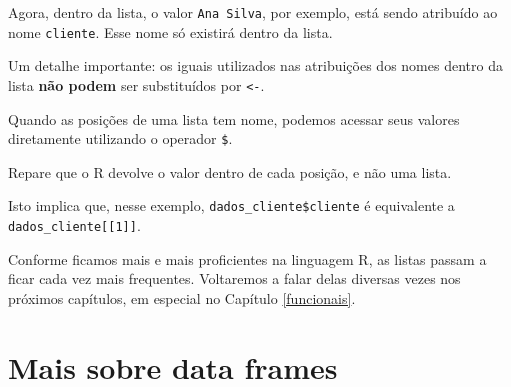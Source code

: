 \documentclass[
]{book}
\newenvironment{Shaded}{\begin{snugshade}}{\end{snugshade}}
\newcommand{\DecValTok}[1]{\textcolor[rgb]{0.00,0.00,0.81}{#1}}
\newcommand{\DocumentationTok}[1]{\textcolor[rgb]{0.56,0.35,0.01}{\textbf{\textit{#1}}}}
\newcommand{\FunctionTok}[1]{\textcolor[rgb]{0.00,0.00,0.00}{#1}}
\newcommand{\NormalTok}[1]{#1}
\newcommand{\SpecialCharTok}[1]{\textcolor[rgb]{0.00,0.00,0.00}{#1}}
\begin{document}
Agora, dentro da lista, o valor \texttt{Ana\ Silva}, por exemplo, está sendo atribuído ao nome \texttt{cliente}. Esse nome só existirá dentro da lista.

Um detalhe importante: os iguais utilizados nas atribuições dos nomes dentro da lista \textbf{não podem} ser substituídos por \texttt{\textless{}-}.

Quando as posições de uma lista tem nome, podemos acessar seus valores diretamente utilizando o operador \texttt{\$}.

\begin{Shaded}
\end{Shaded}

Repare que o R devolve o valor dentro de cada posição, e não uma lista.

\begin{Shaded}
\end{Shaded}

Isto implica que, nesse exemplo, \texttt{dados\_cliente\$cliente} é equivalente a \texttt{dados\_cliente{[}{[}1{]}{]}}.

Conforme ficamos mais e mais proficientes na linguagem R, as listas passam a ficar cada vez mais frequentes. Voltaremos a falar delas diversas vezes nos próximos capítulos, em especial no Capítulo \ref{funcionais}.

\hypertarget{mais-sobre-data-frames}{%
\section{Mais sobre data frames}\label{mais-sobre-data-frames}}
\end{document}

